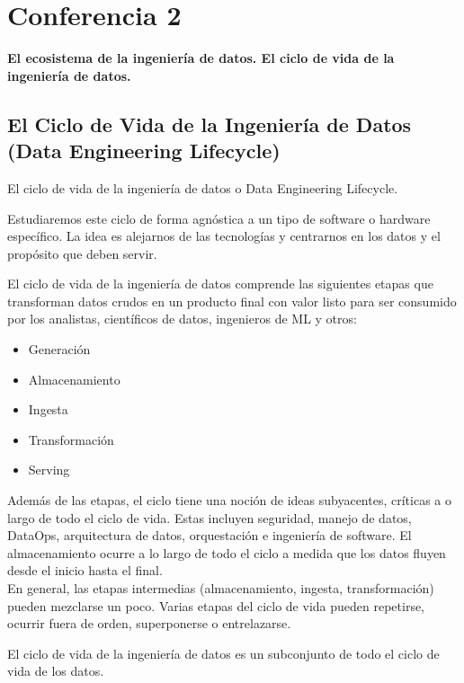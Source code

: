 \documentclass[12pt]{book}
\begin{document}
\chapter{Conferencia 2}
\normalfont\LARGE \textbf{El ecosistema de la ingeniería de datos. El ciclo de vida de la ingeniería de datos.}
\normalfont\small\\


\section{El Ciclo de Vida de la Ingeniería de Datos (Data Engineering Lifecycle)}
El ciclo de vida de la ingeniería de datos o Data Engineering Lifecycle.

Estudiaremos este ciclo de forma agnóstica a un tipo de software o hardware específico.
La idea es alejarnos de las tecnologías y centrarnos en los datos y el propósito que deben servir.

El ciclo de vida de la ingeniería de datos comprende las siguientes etapas que transforman datos crudos en un producto final con valor listo para ser consumido por los analistas, científicos de datos, ingenieros de ML y otros:

\begin{itemize}
    \item Generación
    \item Almacenamiento
    \item Ingesta
    \item Transformación
    \item Serving
\end{itemize}
Además de las etapas, el ciclo tiene una noción de ideas subyacentes, críticas a o largo de todo el ciclo de vida. Estas incluyen seguridad, manejo de datos, DataOps, arquitectura de datos, orquestación e ingeniería de software.
El almacenamiento ocurre a lo largo de todo el ciclo a medida que los datos fluyen desde el inicio hasta el final.\\
En general, las etapas intermedias (almacenamiento, ingesta, transformación) pueden mezclarse un poco. Varias etapas del ciclo de vida pueden repetirse, ocurrir fuera de orden, superponerse o entrelazarse.

El ciclo de vida de la ingeniería de datos es un subconjunto de todo el ciclo de vida de los datos.
\end{document}
